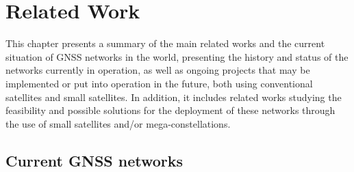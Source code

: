 %
%
%
%
%

%
%
%
%
%

\chapter{Related Work} \label{ch:related-work}


This chapter presents a summary of the main related works and the current situation of GNSS networks in the world, presenting the history and status of the networks currently in operation, as well as ongoing projects that may be implemented or put into operation in the future, both using conventional satellites and small satellites. In addition, it includes related works studying the feasibility and possible solutions for the deployment of these networks through the use of small satellites and/or mega-constellations.

\section{Current GNSS networks}


